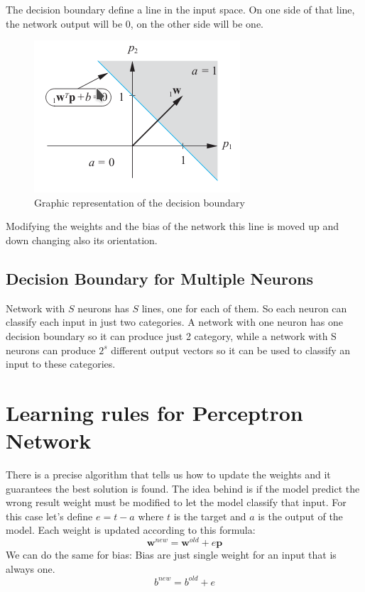 The decision boundary define a line in the input space. On one side of that line, the network output will be 0, on the other side will be one.
\begin{figure}
    \centering
    \includegraphics[scale=0.5]{img/decision_boundary_for_perceptron.png}
    \caption{Graphic representation of the decision boundary}
    \label{img:perceptron_network}
\end{figure}
Modifying the weights and the bias of the network this line is moved up and down changing also its orientation.

\subsection{Decision Boundary for Multiple Neurons}
Network with $S$ neurons has $S$ lines, one for each of them. So each neuron can classify each input in just two categories. A network with one neuron has one decision boundary so it can produce just 2 category, while a network with S neurons can produce $2^s$ different output vectors so it can be used to classify an input to these categories.

\section{Learning rules for Perceptron Network}
There is a precise algorithm that tells us how to update the weights and it guarantees the best solution is found.
The idea behind is if the model predict the wrong result weight must be modified to let the model classify that input. For this case let's define $e = t - a$ where $t$ is the target and $a$ is the output of the model. Each weight is updated according to this formula:
\begin{equation}
\textbf{w}^{new} = \textbf{w}^{old} + e\textbf{p}
\end{equation}
We can do the same for bias: Bias are just single weight for an input that is always one.
\begin{equation}
b^{new} = b^{old} + e
\end{equation}

